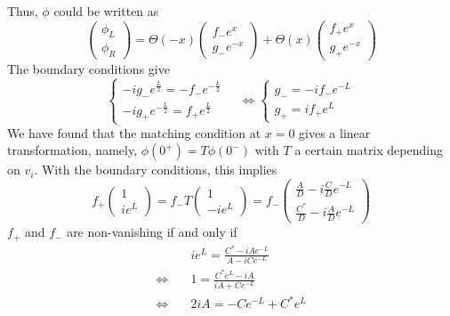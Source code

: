 Thus, $\phi$ could be written as
\begin{equation}
\begin{pmatrix} \phi_L \\ \phi_R \end{pmatrix} = 
\Theta(-x) \begin{pmatrix} f_- e^x  \\ g_-  e^{-x} \end{pmatrix} + 
\Theta(x) \begin{pmatrix} f_+ e^x  \\ g_+  e^{-x} \end{pmatrix}
\end{equation}
The boundary conditions give
\begin{equation}
\begin{cases}
-i g_- e^{\frac{L}{2}} = - f_- e^{-\frac{L}{2}} \\
-ig_+e^{-\frac{L}{2}} = f_+ e^{\frac{L}{2}}
\end{cases} \quad \Leftrightarrow
\begin{cases}
g_- = -i f_- e^{-L} \\
g_+ = i f_+ e^L
\end{cases}
\end{equation}
We have found that the matching condition at $x=0$ gives a linear transformation, namely, $\phi(0^+) = T\phi(0^-)$ with $T$ a certain matrix depending on $v_i$. With the boundary conditions, this implies
\begin{equation}
f_+ \begin{pmatrix} 1 \\ ie^L \end{pmatrix}
= f_- T \begin{pmatrix} 1 \\ -ie^L \end{pmatrix}
= f_- \begin{pmatrix} \frac{A}{D} - i\frac{C}{D} e^{-L}  \\
\frac{C^*}{D} - i \frac{A}{D} e^{-L} \end{pmatrix}
\end{equation}
$f_+$ and $f_-$ are non-vanishing if and only if 
\begin{equation}
\begin{split}
& ie^L = \frac{C^* - iA e^{-L}}{A - iC e^{-L}} \\
\Leftrightarrow \quad & 1 = \frac{C^* e^L - iA}{iA + C e^{-L}} \\
\Leftrightarrow \quad & 2i A = -C e^{-L} + C^*e^L
\end{split}
\end{equation}
